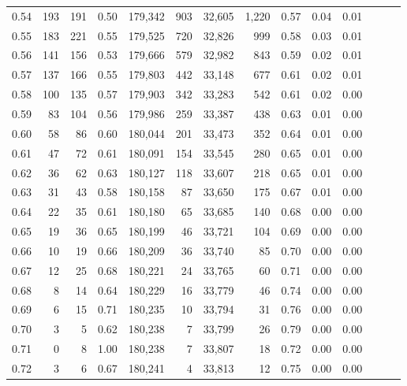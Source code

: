 \begin{tabular}{rrrrrrrrrrrrrr}
0.54 &    193 &    191 &  0.50 &  179,342 &      903 &  32,605 &   1,220 &  0.57 &  0.04 &      0.01 \\
0.55 &    183 &    221 &  0.55 &  179,525 &      720 &  32,826 &     999 &  0.58 &  0.03 &      0.01 \\
0.56 &    141 &    156 &  0.53 &  179,666 &      579 &  32,982 &     843 &  0.59 &  0.02 &      0.01 \\
0.57 &    137 &    166 &  0.55 &  179,803 &      442 &  33,148 &     677 &  0.61 &  0.02 &      0.01 \\
0.58 &    100 &    135 &  0.57 &  179,903 &      342 &  33,283 &     542 &  0.61 &  0.02 &      0.00 \\
0.59 &     83 &    104 &  0.56 &  179,986 &      259 &  33,387 &     438 &  0.63 &  0.01 &      0.00 \\
0.60 &     58 &     86 &  0.60 &  180,044 &      201 &  33,473 &     352 &  0.64 &  0.01 &      0.00 \\
0.61 &     47 &     72 &  0.61 &  180,091 &      154 &  33,545 &     280 &  0.65 &  0.01 &      0.00 \\
0.62 &     36 &     62 &  0.63 &  180,127 &      118 &  33,607 &     218 &  0.65 &  0.01 &      0.00 \\
0.63 &     31 &     43 &  0.58 &  180,158 &       87 &  33,650 &     175 &  0.67 &  0.01 &      0.00 \\
0.64 &     22 &     35 &  0.61 &  180,180 &       65 &  33,685 &     140 &  0.68 &  0.00 &      0.00 \\
0.65 &     19 &     36 &  0.65 &  180,199 &       46 &  33,721 &     104 &  0.69 &  0.00 &      0.00 \\
0.66 &     10 &     19 &  0.66 &  180,209 &       36 &  33,740 &      85 &  0.70 &  0.00 &      0.00 \\
0.67 &     12 &     25 &  0.68 &  180,221 &       24 &  33,765 &      60 &  0.71 &  0.00 &      0.00 \\
0.68 &      8 &     14 &  0.64 &  180,229 &       16 &  33,779 &      46 &  0.74 &  0.00 &      0.00 \\
0.69 &      6 &     15 &  0.71 &  180,235 &       10 &  33,794 &      31 &  0.76 &  0.00 &      0.00 \\
0.70 &      3 &      5 &  0.62 &  180,238 &        7 &  33,799 &      26 &  0.79 &  0.00 &      0.00 \\
0.71 &      0 &      8 &  1.00 &  180,238 &        7 &  33,807 &      18 &  0.72 &  0.00 &      0.00 \\
0.72 &      3 &      6 &  0.67 &  180,241 &        4 &  33,813 &      12 &  0.75 &  0.00 &      0.00 \\

\end{tabular}
